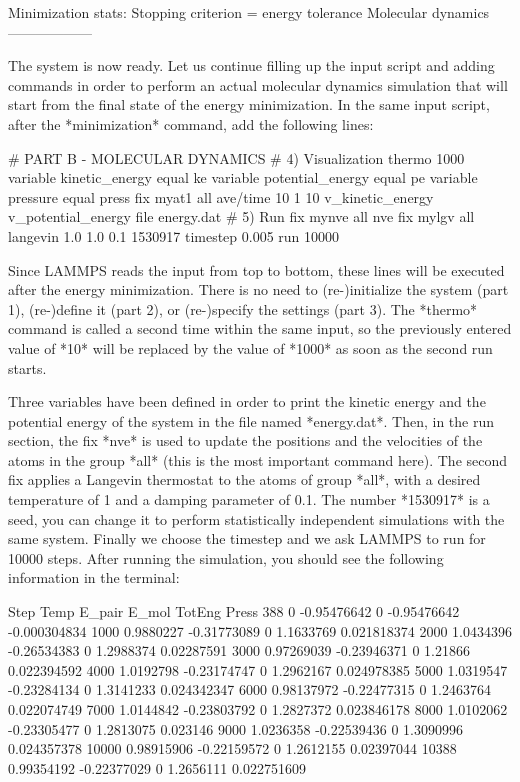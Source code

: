 \begin{lcverbatim}
Minimization stats:
Stopping criterion = energy tolerance
Molecular dynamics
------------------
\end{lcverbatim}

The system is now ready. Let us continue filling up the
input script and adding commands in order to perform an actual molecular dynamics
simulation that will start from the final state of the energy minimization.
In the same input script, after the *minimization* command, add the following
lines:

\begin{lcverbatim}
# PART B - MOLECULAR DYNAMICS
# 4) Visualization
thermo 1000
variable kinetic_energy equal ke
variable potential_energy equal pe
variable pressure equal press
fix myat1 all ave/time 10 1 10 v_kinetic_energy v_potential_energy file energy.dat
# 5) Run
fix mynve all nve
fix mylgv all langevin 1.0 1.0 0.1 1530917
timestep 0.005
run 10000
\end{lcverbatim}

Since LAMMPS reads the input from top to
bottom, these lines will be executed after the energy
minimization. There is no need to (re-)initialize the system
(part 1), (re-)define it (part 2), or (re-)specify the settings
(part 3). The *thermo* command is called a second time within the 
same input, so the previously entered value of *10* will be replaced
by the value of *1000* as soon as the second run starts.

Three variables have been defined in order
to print the kinetic energy and the potential energy 
of the system in the file named *energy.dat*. Then,
in the run section, the fix *nve* is used to update the
positions and the velocities of the atoms in the group
*all* (this is the most important command here). The second
fix applies a Langevin thermostat to the atoms of group
*all*, with a desired temperature of 1 and a damping
parameter of 0.1. The number *1530917* is a seed, you can
change it to perform statistically independent simulations
with the same system. Finally we choose the timestep
and we ask LAMMPS to run for 10000 steps. After running
the simulation, you should see the following information in
the terminal:

\begin{lcverbatim}
Step         Temp       E_pair        E_mol       TotEng        Press
388            0  -0.95476642            0  -0.95476642 -0.000304834
1000    0.9880227  -0.31773089            0    1.1633769  0.021818374 
2000    1.0434396  -0.26534383            0    1.2988374   0.02287591 
3000   0.97269039  -0.23946371            0      1.21866  0.022394592 
4000    1.0192798  -0.23174747            0    1.2962167  0.024978385 
5000    1.0319547  -0.23284134            0    1.3141233  0.024342347 
6000   0.98137972  -0.22477315            0    1.2463764  0.022074749 
7000    1.0144842  -0.23803792            0    1.2827372  0.023846178 
8000    1.0102062  -0.23305477            0    1.2813075     0.023146 
9000    1.0236358  -0.22539436            0    1.3090996  0.024357378 
10000   0.98915906  -0.22159572            0    1.2612155   0.02397044 
10388   0.99354192  -0.22377029            0    1.2656111  0.022751609 
\end{lcverbatim}

